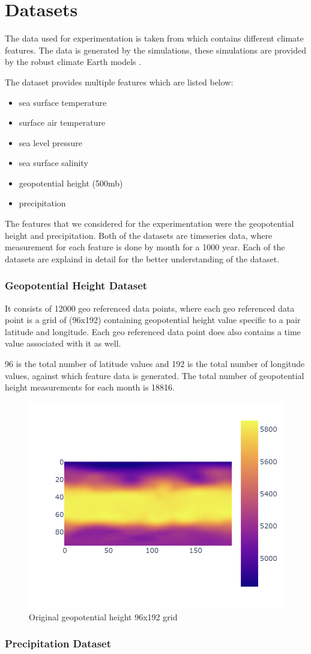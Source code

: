 
\clearpage
\cleardoublepage

\chapter{Datasets}
\label{chap:dataset}

The data used for experimentation is taken from \cite{willi_rath_2023_7779883} which contains different climate features. The data is generated by the simulations, these simulations are provided by the robust climate Earth models \cite{willi_rath_2023_7779883}.

The dataset provides multiple features which are listed below:
\begin{itemize}
    \item sea surface temperature
    \item surface air temperature
    \item sea level pressure
    \item sea surface salinity
    \item geopotential height (500mb)
    \item precipitation
\end{itemize}

The features that we considered for the experimentation were the geopotential height and precipitation.
Both of the datasets are timeseries data, where measurement for each feature is done by month for a 1000 year. Each of the datasets are explaind in detail for the better understanding of the dataset.
\newpage
\subsection{Geopotential Height Dataset}
It consists of 12000 geo referenced data points, where each geo referenced data point is a grid of (96x192) containing geopotential height value specific to a pair latitude and longitude.
Each geo referenced data point does also contains a time value associated with it as well.

96  is the total number of latitude values and  192 is the total number of longitude values, against which feature data is generated. The total number of geopotential height measurements for each month is 18816.

\begin{figure}[h]
    \centering
    \includegraphics[width=0.6\linewidth]{figures/chapter-5/data_original.png}
    \caption{Original geopotential height 96x192 grid }
    \label{fig:org_geopoth}
\end{figure}

\subsection{Precipitation Dataset}